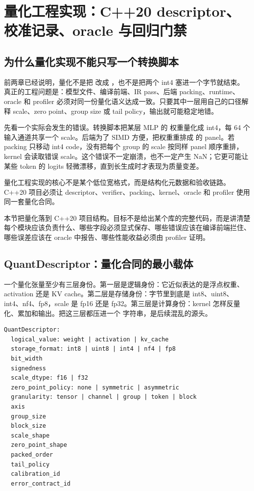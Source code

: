 \section{量化工程实现：C++20 descriptor、校准记录、oracle 与回归门禁}

\subsection{为什么量化实现不能只写一个转换脚本}

前两章已经说明，量化不是把  改成 ，也不是把两个 int4 塞进一个字节就结束。真正的工程问题是：模型文件、编译前端、IR pass、后端 packing、runtime、oracle 和 profiler 必须对同一份量化语义达成一致。只要其中一层用自己的口径解释 scale、zero point、group size 或 tail policy，输出就可能稳定地错。

先看一个实际会发生的错误。转换脚本把某层 MLP 的  权重量化成 int4，每 64 个输入通道共享一个 scale。后端为了 SIMD 方便，把权重重排成  的 panel。若 packing 只移动 int4 code，没有把每个 group 的 scale 按同样 panel 顺序重排，kernel 会读取错误 scale。这个错误不一定崩溃，也不一定产生 NaN；它更可能让某些 token 的 logits 轻微漂移，直到长生成时才表现为质量变差。

\begin{keyidea}
量化工程实现的核心不是某个低位宽格式，而是结构化元数据和验收链路。C++20 项目必须让 descriptor、verifier、packing、kernel、oracle 和 profiler 使用同一套量化合同。
\end{keyidea}

本节把量化落到 C++20 项目结构。目标不是给出某个库的完整代码，而是讲清楚每个模块应该负责什么、哪些字段必须显式保存、哪些错误应该在编译前端拦住、哪些误差应该在 oracle 中报告、哪些性能收益必须由 profiler 证明。

\subsection{QuantDescriptor：量化合同的最小载体}

一个量化张量至少有三层身份。第一层是逻辑身份：它近似表达的是浮点权重、activation 还是 KV cache。第二层是存储身份：字节里到底是 int8、uint8、int4、nf4、fp8，scale 是 fp16 还是 fp32。第三层是计算身份：kernel 怎样反量化、累加和输出。把这三层都压进一个  字符串，是后续混乱的源头。

\begin{lstlisting}[numbers=none,caption={QuantDescriptor 的工程字段}]
QuantDescriptor:
  logical_value: weight | activation | kv_cache
  storage_format: int8 | uint8 | int4 | nf4 | fp8
  bit_width
  signedness
  scale_dtype: f16 | f32
  zero_point_policy: none | symmetric | asymmetric
  granularity: tensor | channel | group | token | block
  axis
  group_size
  block_size
  scale_shape
  zero_point_shape
  packed_order
  tail_policy
  calibration_id
  error_contract_id
\end{lstlisting}

